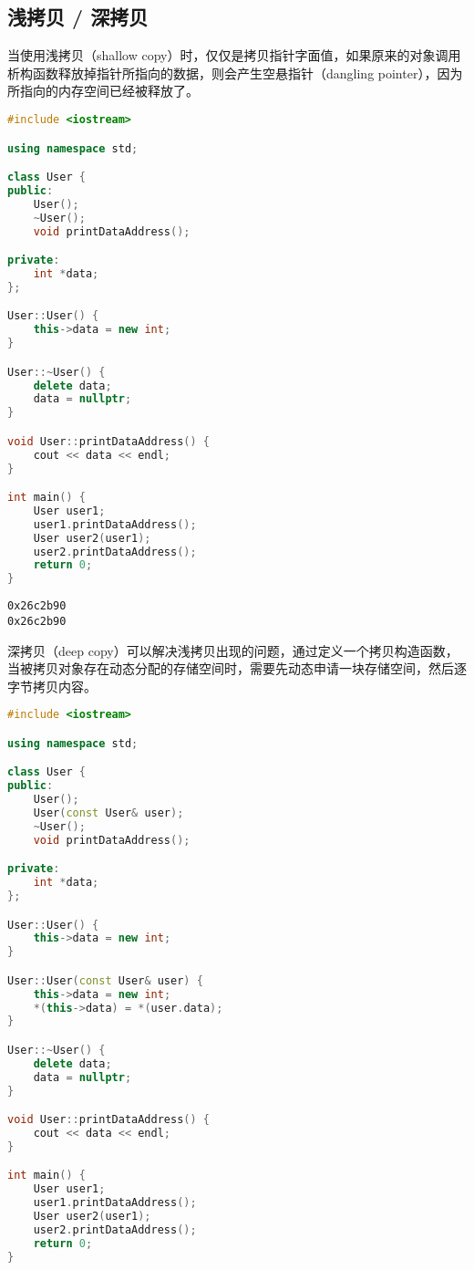 \subsection{浅拷贝 / 深拷贝}

当使用浅拷贝（shallow copy）时，仅仅是拷贝指针字面值，如果原来的对象调用析构函数释放掉指针所指向的数据，则会产生空悬指针（dangling pointer），因为所指向的内存空间已经被释放了。\\


\begin{lstlisting}[language=C++]
#include <iostream>

using namespace std;

class User {
public:
    User();
    ~User();
    void printDataAddress();

private:
    int *data;
};

User::User() {
    this->data = new int;
}

User::~User() {
    delete data;
    data = nullptr;
}

void User::printDataAddress() {
    cout << data << endl;
}

int main() {
    User user1;
    user1.printDataAddress();
    User user2(user1);
    user2.printDataAddress();  
    return 0;
}
\end{lstlisting}

\begin{tcolorbox}
	\begin{verbatim}
0x26c2b90
0x26c2b90
	\end{verbatim}
\end{tcolorbox}

深拷贝（deep copy）可以解决浅拷贝出现的问题，通过定义一个拷贝构造函数，当被拷贝对象存在动态分配的存储空间时，需要先动态申请一块存储空间，然后逐字节拷贝内容。\\


\begin{lstlisting}[language=C++]
#include <iostream>

using namespace std;

class User {
public:
    User();
    User(const User& user);
    ~User();
    void printDataAddress();

private:
    int *data;
};

User::User() {
    this->data = new int;
}

User::User(const User& user) {
    this->data = new int;
    *(this->data) = *(user.data);
}

User::~User() {
    delete data;
    data = nullptr;
}

void User::printDataAddress() {
    cout << data << endl;
}

int main() {
    User user1;
    user1.printDataAddress();
    User user2(user1);
    user2.printDataAddress();  
    return 0;
}
\end{lstlisting}

